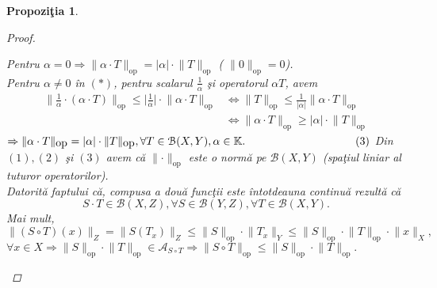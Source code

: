 \documentclass[ a4paper, 12pt]{report}
\newtheorem{prop}[theorem]{\bf Propozi\c tia }
\theoremstyle{definition}
\theoremstyle{remark}
\numberwithin{equation}{section}
\begin{document}
\begin{prop}
\begin{proof}
\begin{enumerate}[(a)]
Pentru $\alpha = 0 \Rightarrow \lVert  \alpha \cdot T \rVert_{\mbox{op}} = \lvert \alpha \rvert \cdot \lVert T \rVert_{\mbox{op}}$ ( $\lVert 0 \rVert_{\mbox{op}} = 0$).\\
Pentru $\alpha \neq 0$ \^in $(\ast)$, pentru scalarul $\frac{1}{\alpha}$ \c si operatorul $\alpha T$, avem
\begin{align*}
\lVert \frac{1}{\alpha} \cdot (\alpha \cdot T) \rVert_{\mbox{op}} \leq \lvert  \frac{1}{\alpha} \rvert \cdot \lVert \alpha \cdot T \rVert_{\mbox{op}} &\Leftrightarrow
\lVert T \rVert_{\mbox{op}} \leq \frac{1}{\lvert \alpha \rvert} \lVert \alpha \cdot T \rVert_{\mbox{op}}\\
&\Leftrightarrow \lVert \alpha \cdot T \rVert_{\mbox{op}} \geq \lvert \alpha \rvert \cdot \lVert T \rVert_{\mbox{op}}
\end{align*}
$\Rightarrow \lVert \alpha \cdot T \rVert_{\mbox{op}} = \lvert \alpha \rvert \cdot \lVert T \rVert_{\mbox{op}}, \forall T \in \mathcal{B}(X,Y), \alpha \in \mathbb{K}. \hspace{35mm}(3) $
Din $(1),(2)$ \c si $(3)$ avem c\u a $\lVert \cdot  \rVert_{\mbox{op}}$ este o norm\u a pe $\mathcal{B}(X,Y)$ (spa\c tiul liniar al tuturor operatorilor).\\
Datorit\u a faptului c\u a, compusa a dou\u a func\c tii este \^intotdeauna continu\u a rezult\u a c\u a 
\[ S \cdot T \in \mathcal{B}(X,Z), \forall S \in \mathcal{B}(Y,Z), \forall T \in \mathcal{B}(X,Y).\]
Mai mult,
\[ \lVert (S \circ T)(x) \rVert_{Z} = \lVert S(T_x)  \rVert_{Z} \leq \lVert S \rVert_{\mbox{op}} \cdot \lVert T_x \rVert_{Y} \leq \lVert S \rVert_{\mbox{op}} \cdot \lVert T \rVert_{\mbox{op}} \cdot \lVert x \rVert_{X} ,\] $\forall x \in X \Rightarrow \lVert S \rVert_{\mbox{op}} \cdot \lVert T \rVert_{\mbox{op}} \in \mathcal{A}_{S \circ T} \Rightarrow \lVert S \circ T \rVert_{\mbox{op}} \leq \lVert S \rVert_{\mbox{op}} \cdot \lVert T \rVert_{\mbox{op}}.$
\end{enumerate}
\end{proof}
\end{prop}
\end{document}

